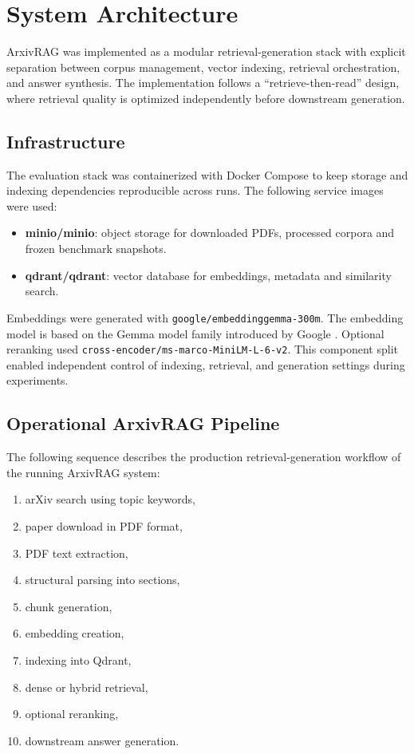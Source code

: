 \documentclass[a4paper,12pt]{article}
\begin{document}
\section{System Architecture}

ArxivRAG was implemented as a modular retrieval-generation stack with explicit separation between corpus management, vector indexing, retrieval orchestration, and answer synthesis. The implementation follows a ``retrieve-then-read'' design, where retrieval quality is optimized independently before downstream generation.

\subsection{Infrastructure}

The evaluation stack was containerized with Docker Compose to keep storage and indexing dependencies reproducible across runs. The following service images were used:

\begin{itemize}
    \item \textbf{minio/minio}: object storage for downloaded PDFs, processed corpora and frozen benchmark snapshots.
    \item \textbf{qdrant/qdrant}: vector database for embeddings, metadata and similarity search.
\end{itemize}

Embeddings were generated with \texttt{google/embeddinggemma-300m}. The embedding model is based on the Gemma model family introduced by Google \cite{gemmateam2024gemma}. Optional reranking used \texttt{cross-encoder/ms-marco-MiniLM-L-6-v2}. This component split enabled independent control of indexing, retrieval, and generation settings during experiments.

\newpage

\subsection{Operational ArxivRAG Pipeline}

The following sequence describes the production retrieval-generation workflow of the running ArxivRAG system:

\begin{enumerate}
    \item arXiv search using topic keywords,
    \item paper download in PDF format,
    \item PDF text extraction,
    \item structural parsing into sections,
    \item chunk generation,
    \item embedding creation,
    \item indexing into Qdrant,
    \item dense or hybrid retrieval,
    \item optional reranking,
    \item downstream answer generation.
\end{enumerate}
\end{document}

